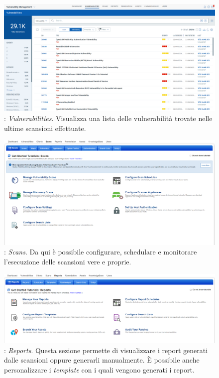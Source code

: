 \documentclass[target=bach,aauheader=]{thud}
\begin{document}
\begin{figure}
\centering
\includegraphics[scale=0.329]{images/qualys_vuln.png}
    \caption{: \textit{Vulnerabilities}. Visualizza una lista delle vulnerabilità trovate nelle ultime scansioni effettuate.}
\end{figure}

\begin{figure}
\centering
\includegraphics[scale=0.329]{images/qualys_scans.png}
    \caption{: \textit{Scans}. Da qui è possibile configurare, schedulare e monitorare l'esecuzione delle scansioni vere e proprie.}
\end{figure}

\begin{figure}
\centering
\includegraphics[scale=0.329]{images/qualys_reports.png}
    \caption{: \textit{Reports}. Questa sezione permette di visualizzare i report generati dalle scansioni oppure generarli manualmente. È possibile anche personalizzare i \textit{template} con i quali vengono generati i report.}
\end{figure}
\end{document}

